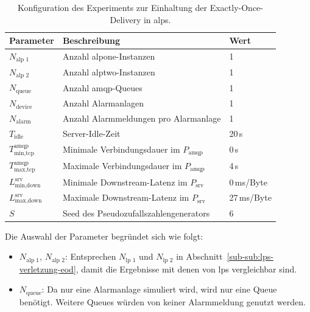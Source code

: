 \begin{table}[H]
    \centering
    \renewcommand{\arraystretch}{1.2}
    \caption{Konfiguration des Experiments zur Einhaltung der Exactly-Once-Delivery in \acrshort{alps}.}
    \label{tab:exp-alps-eod-config}
    \begin{tabular}{|l|l|l|}
        \hline
        \textbf{Parameter}                 & \textbf{Beschreibung}                          & \textbf{Wert} \\
        \hline
        $N_{\text{alp~1}}$                 & Anzahl \gls{alpone}-Instanzen                  & 1             \\
        $N_{\text{alp~2}}$                 & Anzahl \gls{alptwo}-Instanzen                  & 1             \\
        $N_{\text{queue}}$                 & Anzahl \gls{amqp}-Queues                       & 1             \\
        $N_{\text{device}}$                & Anzahl Alarmanlagen                            & 1             \\
        $N_{\text{alarm}}$                 & Anzahl Alarmmeldungen pro Alarmanlage          & 1             \\
        $T_{\text{idle}}$                  & Server-Idle-Zeit                               & 20\,s         \\
        $T_{\text{min,tcp}}^{\text{amqp}}$ & Minimale Verbindungsdauer im $P_{\text{amqp}}$ & 0\,s          \\
        $T_{\text{max,tcp}}^{\text{amqp}}$ & Maximale Verbindungsdauer im $P_{\text{amqp}}$ & 4\,s          \\
        $L_{\text{min,down}}^{\text{srv}}$ & Minimale Downstream-Latenz im $P_{\text{srv}}$ & 0\,ms/Byte    \\
        $L_{\text{max,down}}^{\text{srv}}$ & Maximale Downstream-Latenz im $P_{\text{srv}}$ & 27\,ms/Byte   \\
        $S$                                & Seed des Pseudozufallszahlengenerators         & 6             \\
        \hline
    \end{tabular}
\end{table}

Die Auswahl der Parameter begründet sich wie folgt:

\begin{itemize}
    \item $N_{\text{alp~1}}$, $N_{\text{alp~2}}$: Entsprechen $N_{\text{lp~1}}$ und $N_{\text{lp~2}}$ in Abschnitt~\ref{sub-sub:lps-verletzung-eod}, damit die Ergebnisse mit denen von \gls{lps} vergleichbar sind.
    \item $N_{\text{queue}}$: Da nur eine Alarmanlage simuliert wird, wird nur eine Queue benötigt. Weitere Queues würden von keiner Alarmmeldung genutzt werden.
\end{itemize}


